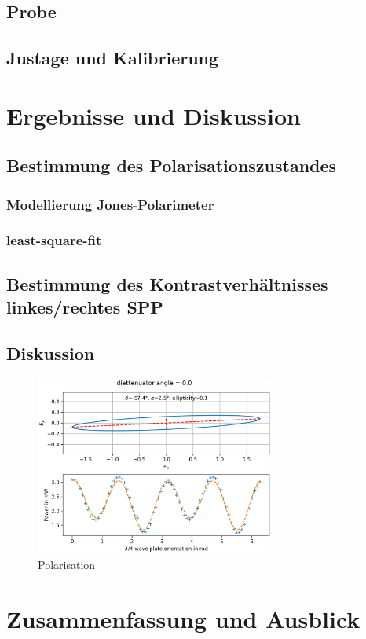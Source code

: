 \documentclass{article}
\begin{document}
\subsection{Probe}
\subsection{Justage und Kalibrierung}
\section{Ergebnisse und Diskussion}
	\subsection{Bestimmung des Polarisationszustandes}
		\subsubsection{Modellierung Jones-Polarimeter}
		\subsubsection{least-square-fit}
	\subsection{Bestimmung des Kontrastverhältnisses linkes/rechtes SPP}
	\subsection{Diskussion}
	\begin{figure}[htbp] 
		\centering
		\includegraphics[width=0.7\textwidth]{figures/polarimeter.png}
		\caption{Polarisation}
		\label{fig:polarimeter}
	\end{figure}
\section{Zusammenfassung und Ausblick}
\newpage

	
\end{document}
